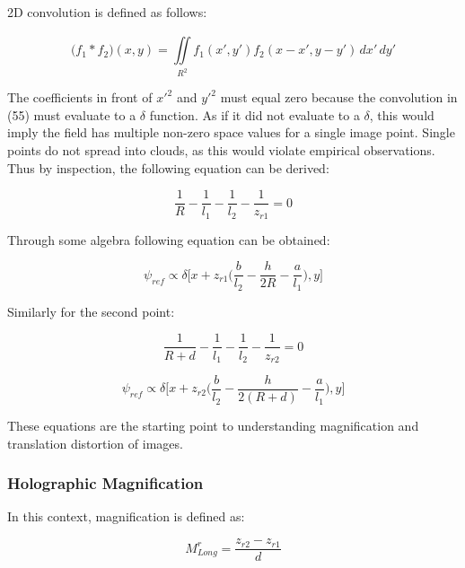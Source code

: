 \documentclass[12pt]{article}
\begin{document}
2D convolution is defined as follows:

\begin{equation}
	\big(f_{1}*f_{2}\big)(x,y) = \iint \limits_{R^2}^{} f_{1}(x',y')f_{2}(x - x',y - y') \,dx'\,dy'
\end{equation}

The coefficients in front of \(x'^2\) and \(y'^2\) must equal zero because the convolution in (55) must evaluate to a \(\delta\) function.
As if it did not evaluate to a \(\delta\), this would imply the field has multiple non-zero space values for a single image point. Single points do not spread into clouds, as this would violate empirical observations. Thus by inspection, the following equation can be derived:

\begin{equation}
	\frac{1}{R} - \frac{1}{l_{1}} - \frac{1}{l_{2}} - \frac{1}{z_{r1}} = 0
\end{equation}

Through some algebra following equation can be obtained:

\begin{equation}
	\psi_{ref} \propto \delta \bigg[ x + z_{r1}\bigg(
	\frac{b}{l_{2}} - \frac{h}{2R} - \frac{a}{l_{1}}\bigg),y\bigg]
\end{equation}

Similarly for the second point:

\begin{equation}
	\frac{1}{R + d} - \frac{1}{l_{1}} - \frac{1}{l_{2}} - \frac{1}{z_{r2}} = 0
\end{equation}

\begin{equation}
        \psi_{ref} \propto \delta \bigg[ x + z_{r2}\bigg(
        \frac{b}{l_{2}} - \frac{h}{2(R + d)} - \frac{a}{l_{1}}\bigg),y\bigg]
\end{equation}

These equations are the starting point to understanding magnification and translation distortion of images.

\subsubsection{Holographic Magnification}

In this context, magnification is defined as:

\begin{equation}
	M_{Long}^r = \frac{z_{r2} - z_{r1}}{d}
\end{equation}
\end{document}
